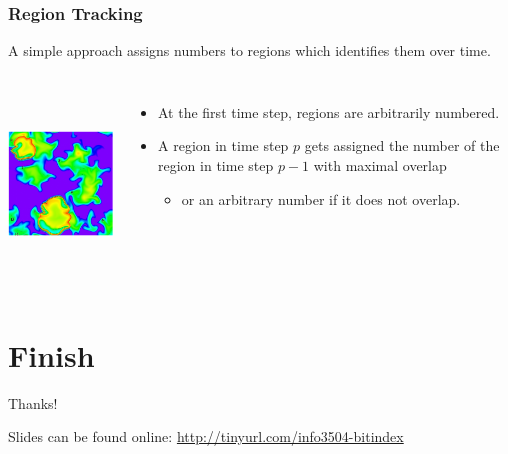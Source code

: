 \documentclass[11pt]{beamer}
\begin{document}
\begin{frame}
	\frametitle{Region Tracking}

	A simple approach assigns numbers to regions which identifies them over time.
	\begin{columns}[c]
		\includegraphics[height=5cm]{regions.png}
		\pause
		\begin{itemize}
			\item At the first time step, regions are arbitrarily numbered.
			\pause
			\item A region in time step $p$ gets assigned the number of the region in time step $p-1$ with maximal overlap
			\begin{itemize}
				\item or an arbitrary number if it does not overlap.
			\end{itemize}
		\end{itemize}
	\end{columns}
\end{frame}

\section[Finish]{Finish}

\begin{frame}
	\Large{Thanks!}
	
	Slides can be found online: \url{http://tinyurl.com/info3504-bitindex}
\end{frame}
\end{document}
